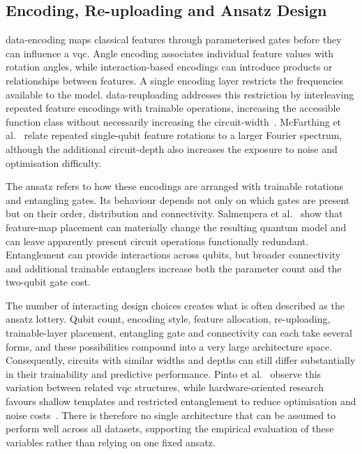 \documentclass[]{UCD_CS_MSc_AAI_Report}
\begin{document}
\subsection{Encoding, Re-uploading and Ansatz Design}
\Gls{data-encoding} maps classical features through parameterised gates before they can influence a \ac{vqc}. Angle encoding associates individual feature values with rotation angles, while interaction-based encodings can introduce products or relationships between features. A single encoding layer restricts the frequencies available to the model. \Gls{data-reuploading} addresses this restriction by interleaving repeated feature encodings with trainable operations, increasing the accessible function class without necessarily increasing the \gls{circuit-width}~\cite{du_quantum_2025}. McFarthing et al.~\cite{mcfarthing_classical_2024} relate repeated single-qubit feature rotations to a larger Fourier spectrum, although the additional \gls{circuit-depth} also increases the exposure to noise and optimisation difficulty.

The ansatz refers to how these encodings are arranged with trainable rotations and entangling gates. Its behaviour depends not only on which gates are present but on their order, distribution and connectivity. Salmenpera et al.~\cite{salmenpera_impact_2024} show that feature-map placement can materially change the resulting quantum model and can leave apparently present circuit operations functionally redundant. Entanglement can provide interactions across qubits, but broader connectivity and additional trainable entanglers increase both the parameter count and the two-qubit gate cost.

The number of interacting design choices creates what is often described as the ansatz lottery. Qubit count, encoding style, feature allocation, re-uploading, trainable-layer placement, entangling gate and connectivity can each take several forms, and these possibilities compound into a very large architecture space. Consequently, circuits with similar widths and depths can still differ substantially in their trainability and predictive performance. Pinto et al.~\cite{pinto_composing_2026} observe this variation between related \ac{vqc} structures, while hardware-oriented research favours shallow templates and restricted entanglement to reduce optimisation and noise costs~\cite{friedrich_quantum_2025,park_addressing_2025}. There is therefore no single architecture that can be assumed to perform well across all datasets, supporting the empirical evaluation of these variables rather than relying on one fixed ansatz.
\end{document}
